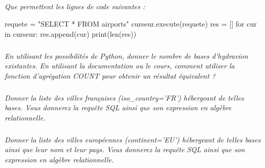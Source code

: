 \documentclass[10pt]{article}
\newif\ifprof
\begin{document}
\subparagraph{}
\textit{Que permettent les lignes de code suivantes :}

\begin{py}
\begin{python}
requete = "SELECT * FROM airports"
curseur.execute(requete)
res = []
for cur in curseur:
    res.append(cur)
print(len(res))
\end{python}
\end{py}
\ifprof
\begin{corrige}
Ces lignes permettent de donner le nombre d'aéroports présents dans la base. 
\end{corrige}
\else
\fi


\subparagraph{}
\textit{En utilisant les possibilités de Python, donner le nombre de bases d'hydravion existantes. En utilisant la documentation ou le cours, comment utiliser la fonction d'agrégation COUNT pour obtenir un résultat équivalent ?}
\ifprof
\begin{corrige}
Voir Fichier.py.
\begin{envsql}
\begin{sql}
SELECT COUNT(*) FROM airports WHERE type='seaplane_base'
\end{sql}
\end{envsql}

Il y a 899 bases. 

\end{corrige}
\else
\fi

\subparagraph{}
\textit{Donner la liste des villes françaises (\textsl{iso\_country='FR'}) hébergeant de telles bases. Vous donnerez la requête SQL ainsi que son expression en algèbre relationnelle.}
\ifprof
\begin{corrige}
\begin{envsql}
\begin{sql}
SELECT municipality FROM airports WHERE type='seaplane_base' AND iso_country='FR'
\end{sql}
\end{envsql}
$$
\pi_{\text{municipality}}\left(\sigma_{\text{iso\_country='FR'} \wedge \text{type='seaplane\_base'} }\left(\text{airports}\right)\right)
$$
La seule infrastructure présente dans la base est celle de Marseillle (Marignanne).
\end{corrige}
\else
\fi



\subparagraph{}
\textit{Donner la liste des villes européennes (\textsl{continent='EU'}) hébergeant de telles bases ainsi que leur nom et leur pays. Vous donnerez la requête SQL ainsi que son expression en algèbre relationnelle.}%
\ifprof
\begin{corrige}
\begin{envsql}
\begin{sql}
SELECT name,municipality FROM airports WHERE type='seaplane_base' AND continent='EU'
\end{sql}
\end{envsql}
$$
\pi_{\text{municipality}}\left(\sigma_{\text{type='seaplane\_base'} \wedge \text{continent='EU'} }\left(\text{airports}\right)\right)
$$
\end{corrige}\else
\fi
\end{document}
